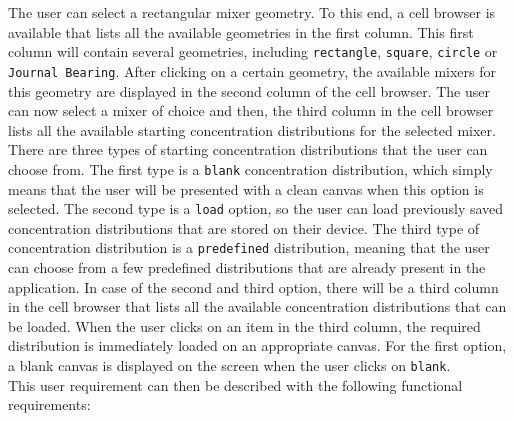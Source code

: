 The user can select a rectangular mixer geometry. To this end, a cell browser is available that lists all the available geometries in the first column. This first column will contain several geometries, including \texttt{rectangle}, \texttt{square}, \texttt{circle} or \texttt{Journal Bearing}. After clicking on a certain geometry, the available mixers for this geometry are displayed in the second column of the cell browser. The user can now select a mixer of choice and then, the third column in the cell browser lists all the available starting concentration distributions for the selected mixer. There are three types of starting concentration distributions that the user can choose from. The first type is a \texttt{blank} concentration distribution, which simply means that the user will be presented with a clean canvas when this option is selected. The second type is a \texttt{load} option, so the user can load previously saved concentration distributions that are stored on their device. The third type of concentration distribution is a \texttt{predefined} distribution, meaning that the user can choose from a few predefined distributions that are already present in the application. In case of the second and third option, there will be a third column in the cell browser that lists all the available concentration distributions that can be loaded. When the user clicks on an item in the third column, the required distribution is immediately loaded on an appropriate canvas. For the first option, a blank canvas is displayed on the screen when the user clicks on \texttt{blank}. \\
This user requirement can then be described with the following functional requirements:


